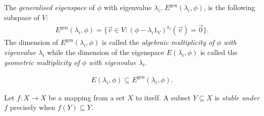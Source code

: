 \documentclass{article}
\begin{document}
\begin{definition}
	The \emph{generalised eigenspace} of $\phi$ with eigenvalue $\lambda_i$, $E^\text{gen}(\lambda_i,\phi)$,
	is the following subspace of $V$:
	\begin{align*}
		E^\text{gen}(\lambda_i,\phi)=\{\vec v\in V : (\phi-\lambda_i 1_V)^{a_i}(\vec v)=\vec 0\}.
	\end{align*}
	The dimension of $E^\text{gen}(\lambda_i,\phi)$ is called the \emph{algebraic multiplicity of $\phi$
		with eigenvalue $\lambda_i$} while the dimension of the eigenspace $E(\lambda_i,\phi)$ is called
	the \emph{geometric multiplicity of $\phi$ with eigenvalue $\lambda_i$}.
\end{definition}

\begin{lemma}[Remark 6.3.3]
	\begin{align*}
		E(\lambda_i,\phi)\subseteq E^\text{gen}(\lambda_i,\phi).
	\end{align*}
\end{lemma}

\begin{definition}
	Let $f:X\to X$ be a mapping from a set $X$ to itself. A subset $Y\subseteq X$ is \emph{stable under}
	$f$ precisely when $f(Y)\subseteq Y$.
\end{definition}
\end{document}
